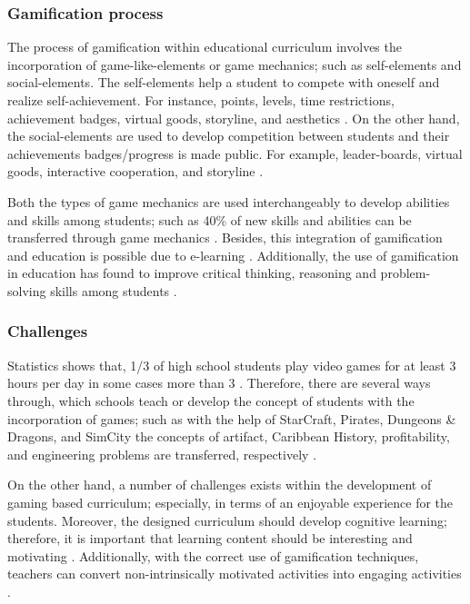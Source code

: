 \subsubsection{Gamification process}
The process of gamification within educational curriculum involves the incorporation of game-like-elements or game mechanics; such as self-elements and social-elements. The self-elements help a student to compete with oneself and realize self-achievement. For instance, points, levels, time restrictions, achievement badges, virtual goods, storyline, and aesthetics \cite{glover2013play, hanus2015assessing}. On the other hand, the social-elements are used to develop competition between students and their achievements badges/progress is made public. For example, leader-boards, virtual goods, interactive cooperation, and storyline  \cite{hanus2015assessing}. \par \vspace{1.5mm}
Both the types of game mechanics are used interchangeably to develop abilities and skills among students; such as 40\% of new skills and abilities can be transferred through game mechanics \cite{hsinyuanhuang2013gamification}. Besides, this integration of gamification and education is possible due to e-learning \cite{kiryakova2014gamification}. Additionally, the use of gamification in education has found to improve critical thinking, reasoning and problem-solving skills among students \cite{nemeth2015gamification}.

\subsubsection{Challenges}
Statistics shows that, 1/3 of high school students play video games for at least 3 hours per day {\small in some cases more than 3} \cite{kurshan2016gamification}. Therefore, there are several ways through, which schools teach or develop the concept of students with the incorporation of games; such as with the help of StarCraft, Pirates, Dungeons \& Dragons, and SimCity the concepts of artifact, Caribbean History, profitability, and engineering problems are transferred, respectively \cite{ericKlop2009gamification}. \par \vspace{1.5mm}
On the other hand, a number of challenges exists within the development of gaming based curriculum; especially, in terms of an enjoyable experience for the students. Moreover, the designed curriculum should develop cognitive learning; therefore, it is important that learning content should be interesting and motivating \cite{kurshan2016gamification}. Additionally, with the correct use of gamification techniques, teachers can convert non-intrinsically motivated activities into engaging activities \cite{nemeth2015gamification}.

